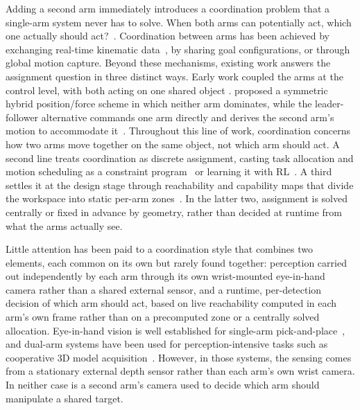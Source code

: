 Adding a second arm immediately introduces a coordination problem that a single-arm system never has to solve. When both arms can potentially act, which one actually should act?~\citep{sk2025sharedvision}. Coordination between arms has been achieved by exchanging real-time kinematic data~\citep{sk2025distance}, by sharing goal configurations, or through global motion capture. Beyond these mechanisms, existing work answers the assignment question in three distinct ways. Early work coupled the arms at the control level, with both acting on one shared object \citep{ortenzi2018dual}. \citet{uchiyama1988symmetric} proposed a symmetric hybrid position/force scheme in which neither arm dominates, while the leader-follower alternative commands one arm directly and derives the second arm's motion to accommodate it~\citep{caccavale2025cooperative}. Throughout this line of work, coordination concerns how two arms move together on the same object, not which arm should act. A second line treats coordination as discrete assignment, casting task allocation and motion scheduling as a constraint program~\citep{behrens2019constraint} or learning it with RL~\citep{jermann2024efficient}. A third settles it at the design stage through reachability and capability maps that divide the workspace into static per-arm zones~\citep{zacharias2007capturing}. In the latter two, assignment is solved centrally or fixed in advance by geometry, rather than decided at runtime from what the arms actually see.

Little attention has been paid to a coordination style that combines two elements, each common on its own but rarely found together: perception carried out independently by each arm through its own wrist-mounted eye-in-hand camera rather than a shared external sensor, and a runtime, per-detection decision of which arm should act, based on live reachability computed in each arm's own frame rather than on a precomputed zone or a centrally solved allocation. Eye-in-hand vision is well established for single-arm pick-and-place~\citep{nguyen2025vision}, and dual-arm systems have been used for perception-intensive tasks such as cooperative 3D model acquisition~\citep{kobayashi2022obtaining}. However, in those systems, the sensing comes from a stationary external depth sensor rather than each arm's own wrist camera. In neither case is a second arm's camera used to decide which arm should manipulate a shared target.

